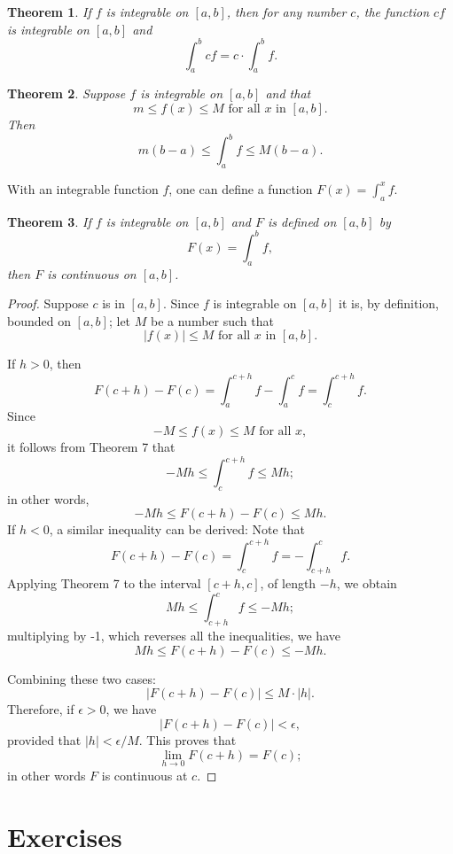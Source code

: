 \documentclass{article}
\newtheorem{theorem}{Theorem}
\begin{document}
\begin{theorem}
  If $f$ is integrable on $[a, b]$, then for any number $c$, the function $cf$
  is integrable on $[a, b]$ and \[
    \int_a^b cf = c \cdot \int_a^b f.
  \]
\end{theorem}

\begin{theorem}
  Suppose $f$ is integrable on $[a, b]$ and that \[
    m \leq f(x) \leq M \text{ for all } x \text{ in } [a, b].
  \] Then \[
    m(b - a) \leq \int_a^b f \leq M(b - a).
  \]
\end{theorem}

With an integrable function $f$, one can define a function $F(x) = \int_a^x f$.

\begin{theorem}
  If $f$ is integrable on $[a, b]$ and $F$ is defined on $[a, b]$ by
  \begin{equation*}
    F(x) = \int_a^b f,
  \end{equation*} then $F$ is continuous on $[a, b]$.
\end{theorem}

\begin{proof}
  Suppose $c$ is in $[a, b]$. Since $f$ is integrable on $[a, b]$ it is, by
  definition, bounded on $[a, b]$; let $M$ be a number such that \[
    |f(x)| \leq M \text{ for all } x \text{ in } [a, b].
  \]

  If $h > 0$, then \[
    F(c + h) - F(c) = \int_a^{c + h} f - \int_a^c f = \int_c^{c + h} f.
  \] Since \[
    -M \leq f(x) \leq M \text{ for all } x,
  \] it follows from Theorem 7 that \[
    -Mh \leq \int_c^{c + h} f \leq Mh;
  \] in other words, \[
    -Mh \leq F(c + h) - F(c) \leq Mh.
  \] If $h < 0$, a similar inequality can be derived: Note that \[
    F(c + h) - F(c) = \int_c^{c + h} f = -\int_{c + h}^c f.
  \] Applying Theorem 7 to the interval $[c + h, c]$, of length $-h$, we obtain
  \[
    Mh \leq \int_{c + h}^c f \leq -Mh;
  \] multiplying by -1, which reverses all the inequalities, we have \[
    Mh \leq F(c + h) - F(c) \leq -Mh.
  \]

  Combining these two cases: \[
    |F(c + h) - F(c)| \leq M \cdot |h|.
  \] Therefore, if $\epsilon > 0$, we have \[
    |F(c + h) - F(c)| < \epsilon,
  \] provided that $|h| < \epsilon/M$. This proves that \[
    \lim_{h \to 0} F(c + h) = F(c);
  \] in other words $F$ is continuous at $c$.
\end{proof}

\section*{Exercises}
\end{document}
